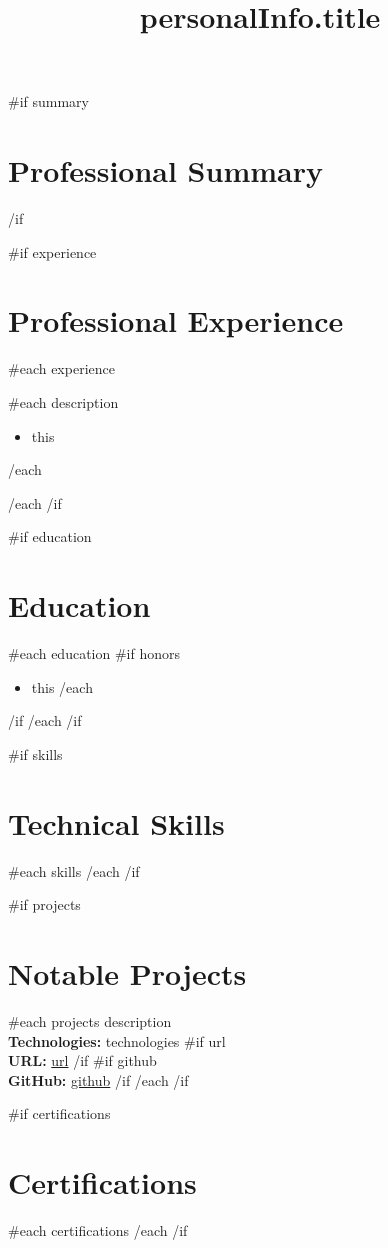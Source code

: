 \documentclass[11pt,a4paper,sans]{moderncv}
\title{{{personalInfo.title}}}
\begin{document}
\makecvtitle

{{#if summary}}
\section{Professional Summary}
{{/if}}

{{#if experience}}
\section{Professional Experience}
{{#each experience}}
{
{{#each description}}
\begin{itemize}
\item {{this}}
\end{itemize}
{{/each}}
}
{{/each}}
{{/if}}

{{#if education}}
\section{Education}
{{#each education}}
{{#if honors}}
{
\begin{itemize}
{{#each honors}}
\item {{this}}
{{/each}}
\end{itemize}
}
{{/if}}
{{/each}}
{{/if}}

{{#if skills}}
\section{Technical Skills}
{{#each skills}}
{{/each}}
{{/if}}

{{#if projects}}
\section{Notable Projects}
{{#each projects}}
{
{{description}}
\\
\textbf{Technologies:} {{technologies}}
{{#if url}}
\\
\textbf{URL:} \href{{{url}}}{{{url}}}
{{/if}}
{{#if github}}
\\
\textbf{GitHub:} \href{{{github}}}{{{github}}}
{{/if}}
}
{{/each}}
{{/if}}

{{#if certifications}}
\section{Certifications}
{{#each certifications}}
{{/each}}
{{/if}}
\end{document}
